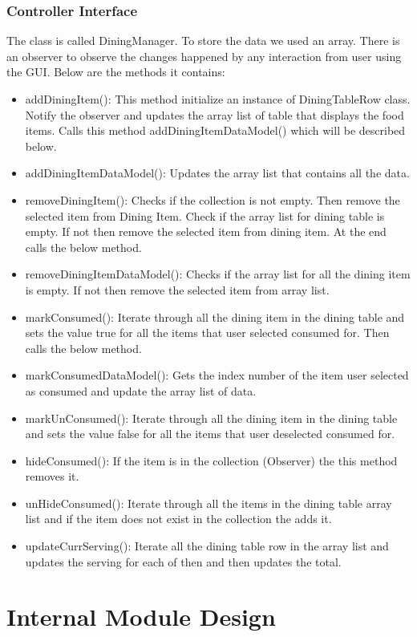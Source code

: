 \documentclass{scrreprt}
\begin{document}
\subsection{Controller Interface}

The class is called DiningManager. To store the data we used an array. There is an observer to observe the changes happened by any interaction from user using the GUI. Below are the methods it contains:

\begin{itemize}
	\item addDiningItem(): This method initialize an instance of DiningTableRow class. Notify the observer and updates the array list of table that displays the food items. Calls this method addDiningItemDataModel() which will be described below.
	\item addDiningItemDataModel(): Updates the array list that contains all the data.
	\item removeDiningItem(): Checks if the collection is not empty. Then remove the selected item from Dining Item. Check if the array list for dining table is empty. If not then remove the selected item from dining item. At the end calls the below method.
	\item removeDiningItemDataModel(): Checks if the array list for all the dining item is empty. If not then remove the selected item from array list.
	\item markConsumed(): Iterate through all the dining item in the dining table and sets the value true for all the items that user selected consumed for. Then calls the below method.
	\item markConsumedDataModel(): Gets the index number of the item user selected as consumed and update the array list of data.
	\item markUnConsumed(): Iterate through all the dining item in the dining table and sets the value false for all the items that user deselected consumed for.
	\item hideConsumed(): If the item is in the collection (Observer) the this method removes it.
	\item unHideConsumed(): Iterate through all the items in the dining table array list and if the item does not exist in the collection the adds it.
	\item updateCurrServing(): Iterate all the dining table row in the array list and updates the serving for each of then and then updates the total.
\end{itemize}

\chapter{Internal Module Design}


\end{document}

